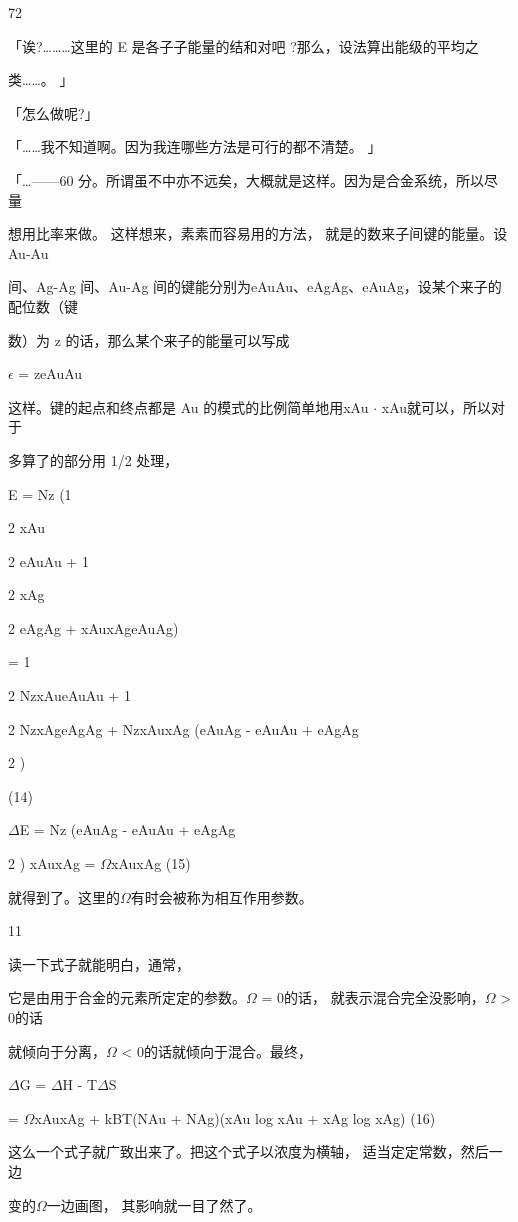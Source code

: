 72\par
「诶?………这里的 E 是各子子能量的结和对吧 ?那么，设法算出能级的平均之\par
类……。 」\par
「怎么做呢?」\par
「……我不知道啊。因为我连哪些方法是可行的都不清楚。 」\par
「…——60 分。所谓虽不中亦不远矣，大概就是这样。因为是合金系统，所以尽量\par
想用比率来做。 这样想来，素素而容易用的方法， 就是的数来子间键的能量。设Au-Au\par
间、Ag-Ag 间、Au-Ag 间的键能分别为eAuAu、eAgAg、eAuAg，设某个来子的配位数（键\par
数）为 z 的话，那么某个来子的能量可以写成\par
$\epsilon$ = zeAuAu\par
这样。键的起点和终点都是 Au 的模式的比例简单地用xAu $\cdot$ xAu就可以，所以对于\par
多算了的部分用 1/2 处理，\par
E = Nz (1\par
2 xAu\par
2 eAuAu + 1\par
2 xAg\par
2 eAgAg + xAuxAgeAuAg)\par
= 1\par
2 NzxAueAuAu + 1\par
2 NzxAgeAgAg + NzxAuxAg (eAuAg - eAuAu + eAgAg\par
2 )\par
(14)\par
$\Delta$E = Nz (eAuAg - eAuAu + eAgAg\par
2 ) xAuxAg = $\Omega$xAuxAg (15)\par
就得到了。这里的$\Omega$有时会被称为相互作用参数。\par
11\par
读一下式子就能明白，通常，\par
它是由用于合金的元素所定定的参数。$\Omega$ = 0的话， 就表示混合完全没影响，$\Omega$ > 0的话\par
就倾向于分离，$\Omega$ < 0的话就倾向于混合。最终，\par
$\Delta$G = $\Delta$H - T$\Delta$S\par
= $\Omega$xAuxAg + kBT(NAu + NAg)(xAu log xAu + xAg log xAg) (16)\par
这么一个式子就广致出来了。把这个式子以浓度为横轴， 适当定定常数，然后一边\par
变的$\Omega$一边画图， 其影响就一目了然了。\par
